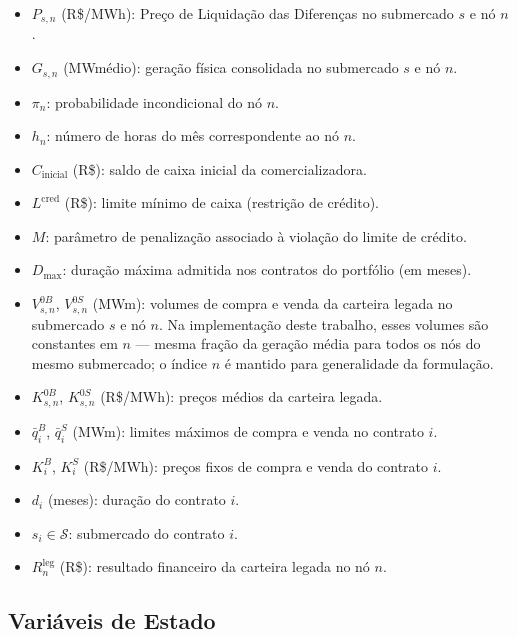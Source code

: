 \begin{itemize}
  \item $P_{s,n}$ (R\$/MWh): Pre\c{c}o de Liquida\c{c}\~ao das Diferen\c{c}as no submercado $s$ e n\'o $n$.
  \item $G_{s,n}$ (MWm\'edio): gera\c{c}\~ao f\'isica consolidada no submercado $s$ e n\'o $n$.
  \item $\pi_n$: probabilidade incondicional do n\'o $n$.
  \item $h_n$: n\'umero de horas do m\^es correspondente ao n\'o $n$.
  \item $C_{\text{inicial}}$ (R\$): saldo de caixa inicial da comercializadora.
  \item $L^{\text{cred}}$ (R\$): limite m\'inimo de caixa (restri\c{c}\~ao de cr\'edito).
  \item $M$: par\^ametro de penaliza\c{c}\~ao associado \`a viola\c{c}\~ao do limite de cr\'edito.
  \item $D_{\max}$: dura\c{c}\~ao m\'axima admitida nos contratos do portf\'olio (em meses).
  \item $V^{0B}_{s,n}$, $V^{0S}_{s,n}$ (MWm): volumes de compra e venda da carteira legada no submercado $s$ e n\'o $n$. Na implementa\c{c}\~ao deste trabalho, esses volumes s\~ao constantes em $n$ --- mesma fra\c{c}\~ao da gera\c{c}\~ao m\'edia para todos os n\'os do mesmo submercado; o \'indice $n$ \'e mantido para generalidade da formula\c{c}\~ao.
  \item $K^{0B}_{s,n}$, $K^{0S}_{s,n}$ (R\$/MWh): pre\c{c}os m\'edios da carteira legada.
  \item $\bar{q}^B_i$, $\bar{q}^S_i$ (MWm): limites m\'aximos de compra e venda no contrato $i$.
  \item $K^B_i$, $K^S_i$ (R\$/MWh): pre\c{c}os fixos de compra e venda do contrato $i$.
  \item $d_i$ (meses): dura\c{c}\~ao do contrato $i$.
  \item $s_i \in \mathcal{S}$: submercado do contrato $i$.
  \item $R^{\text{leg}}_n$ (R\$): resultado financeiro da carteira legada no n\'o $n$.
\end{itemize}

\subsection*{Vari\'aveis de Estado}

